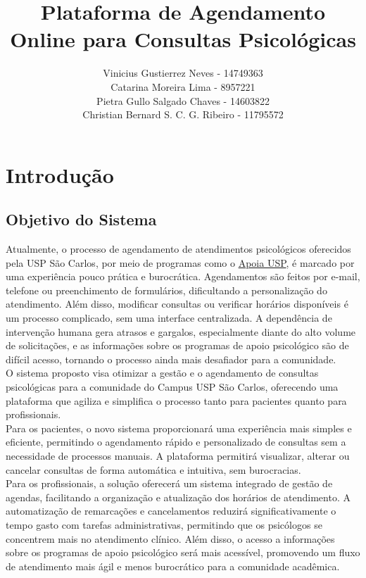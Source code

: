 \documentclass[a4paper,12pt]{report}
\title{\textbf{Plataforma de Agendamento Online para Consultas Psicológicas}\vspace{70mm}}
\author{
  Vinicius Gustierrez Neves - 14749363 \\
  Catarina Moreira Lima - 8957221 \\
  Pietra Gullo Salgado Chaves - 14603822 \\
  Christian Bernard S. C. G. Ribeiro - 11795572
}
\begin{document}
\maketitle
\newpage

\tableofcontents
\newpage

\chapter{Introdução}

\section{Objetivo do Sistema}
Atualmente, o processo de agendamento de atendimentos psicológicos oferecidos pela USP São Carlos, por meio de programas como o \href{https://www.puspsc.usp.br/saude-mental/}{Apoia USP}, é marcado por uma experiência pouco prática e burocrática. Agendamentos são feitos por e-mail, telefone ou preenchimento de formulários, dificultando a personalização do atendimento. Além disso, modificar consultas ou verificar horários disponíveis é um processo complicado, sem uma interface centralizada. A dependência de intervenção humana gera atrasos e gargalos, especialmente diante do alto volume de solicitações, e as informações sobre os programas de apoio psicológico são de difícil acesso, tornando o processo ainda mais desafiador para a comunidade.\\

O sistema proposto visa otimizar a gestão e o agendamento de consultas psicológicas para a comunidade do Campus USP São Carlos, oferecendo uma plataforma que agiliza e simplifica o processo tanto para pacientes quanto para profissionais.\\

Para os pacientes, o novo sistema proporcionará uma experiência mais simples e eficiente, permitindo o agendamento rápido e personalizado de consultas sem a necessidade de processos manuais. A plataforma permitirá visualizar, alterar ou cancelar consultas de forma automática e intuitiva, sem burocracias.\\

Para os profissionais, a solução oferecerá um sistema integrado de gestão de agendas, facilitando a organização e atualização dos horários de atendimento. A automatização de remarcações e cancelamentos reduzirá significativamente o tempo gasto com tarefas administrativas, permitindo que os psicólogos se concentrem mais no atendimento clínico. Além disso, o acesso a informações sobre os programas de apoio psicológico será mais acessível, promovendo um fluxo de atendimento mais ágil e menos burocrático para a comunidade acadêmica.\\
\end{document}
